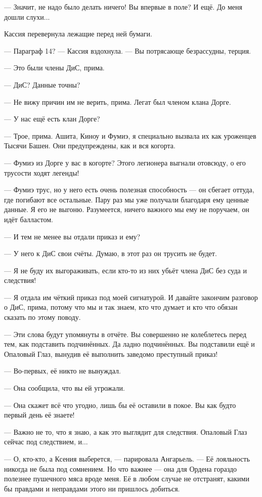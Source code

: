 --- Значит, не надо было делать ничего!
Вы впервые в поле?
И ещё.
До меня дошли слухи...

Кассия перевернула лежащие перед ней бумаги.

--- Параграф 14? --- Кассия вздохнула.
--- Вы потрясающе безрассудны, терция.

--- Это были члены ДиС, прима.

--- ДиС?
Данные точны?

--- Не вижу причин им не верить, прима.
Легат был членом клана Дорге.

--- У нас ещё есть клан Дорге?

--- Трое, прима.
Ашита, Киноу и Фумиэ, я специально вызвала их как уроженцев Тысячи Башен.
Они предупреждены, как и вся когорта.

--- Фумиэ из Дорге у вас в когорте?
Этого легионера выгнали отовсюду, о его трусости ходят легенды!

--- Фумиэ трус, но у него есть очень полезная способность --- он сбегает оттуда, где погибают все остальные.
Пару раз мы уже получали благодаря ему ценные данные.
Я его не выгоню.
Разумеется, ничего важного мы ему не поручаем, он идёт балластом.

--- И тем не менее вы отдали приказ и ему?

--- У него к ДиС свои счёты.
Думаю, в этот раз он трусить не будет.

--- Я не буду их выгораживать, если кто-то из них убьёт члена ДиС без суда и следствия!

--- Я отдала им чёткий приказ под моей сигнатурой.
И давайте закончим разговор о ДиС, прима, потому что мы и так знаем, кто что думает и кто что обязан сказать по этому поводу.

--- Эти слова будут упомянуты в отчёте.
Вы совершенно не колеблетесь перед тем, как подставить подчинённых.
Да ладно подчинённых.
Вы подставили ещё и Опаловый Глаз, вынудив её выполнить заведомо преступный приказ!

--- Во-первых, её никто не вынуждал.

--- Она сообщила, что вы ей угрожали.

--- Она скажет всё что угодно, лишь бы её оставили в покое.
Вы как будто первый день её знаете!

--- Важно не то, что я знаю, а как это выглядит для следствия.
Опаловый Глаз сейчас под следствием, и...

--- О, кто-кто, а Ксения выберется, --- парировала Ангарьель.
--- Её лояльность никогда не была под сомнением.
Но что важнее --- она для Ордена гораздо полезнее пушечного мяса вроде меня.
Её в любом случае не отстранят, какими бы правдами и неправдами этого ни пришлось добиться.

